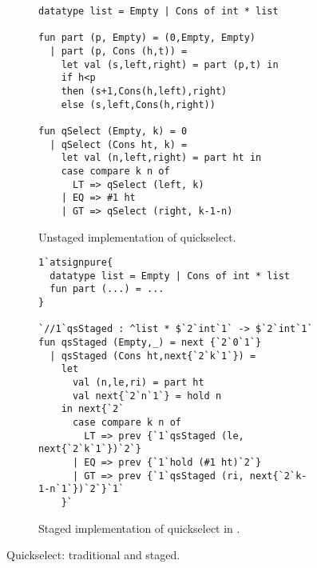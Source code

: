 
\begin{figure*}
\begin{subfigure}{0.5\textwidth}
\begin{lstlisting} 
datatype list = Empty | Cons of int * list

fun part (p, Empty) = (0,Empty, Empty) 
  | part (p, Cons (h,t)) = 
    let val (s,left,right) = part (p,t) in 
    if h<p 
    then (s+1,Cons(h,left),right) 
    else (s,left,Cons(h,right))

fun qSelect (Empty, k) = 0
  | qSelect (Cons ht, k) =
    let val (n,left,right) = part ht in
    case compare k n of
      LT => qSelect (left, k)
    | EQ => #1 ht
    | GT => qSelect (right, k-1-n)
\end{lstlisting}
\caption{Unstaged implementation of quickselect.}
\label{fig:qs-unstaged}
\end{subfigure}%
\begin{subfigure}{0.5\textwidth}
\begin{lstlisting} 
1`atsignpure{
  datatype list = Empty | Cons of int * list
  fun part (...) = ...
} 

`//1`qsStaged : ^list * $`2`int`1` -> $`2`int`1`
fun qsStaged (Empty,_) = next {`2`0`1`}
  | qsStaged (Cons ht,next{`2`k`1`}) = 
    let 
      val (n,le,ri) = part ht
      val next{`2`n`1`} = hold n 
    in next{`2`
      case compare k n of
        LT => prev {`1`qsStaged (le, next{`2`k`1`})`2`}
      | EQ => prev {`1`hold (#1 ht)`2`}
      | GT => prev {`1`qsStaged (ri, next{`2`k-1-n`1`})`2`}`1`
    }`
\end{lstlisting}
\caption{Staged implementation of quickselect in \lang.}
\vspace{1.3em}
\label{fig:qs-staged}
\end{subfigure}
\caption{Quickselect: traditional and staged.}
\end{figure*}


